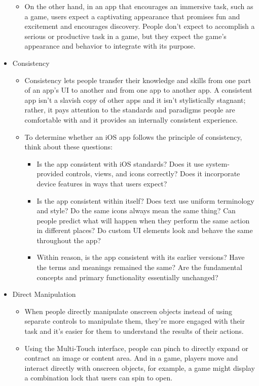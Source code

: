 \begin{itemize}
\begin{itemize}
	\newpage
	\item On the other hand, in an app that encourages an immersive task, such as a game, users expect a captivating appearance that promises fun and excitement and encourages discovery. People don't expect to accomplish a serious or productive task in a game, but they expect the game's appearance and behavior to integrate with its purpose.
	\end{itemize}
\item Consistency
	\begin{itemize}
	\item Consistency lets people transfer their knowledge and skills from one part of an app's UI to another and from one app to another app. A consistent app isn't a slavish copy of other apps and it isn't stylistically stagnant; rather, it pays attention to the standards and paradigms people are comfortable with and it provides an internally consistent experience. 
	\item To determine whether an iOS app follows the principle of consistency, think about these questions:
		\begin{itemize}
		\item Is the app consistent with iOS standards? Does it use system-provided controls, views, and icons correctly? Does it incorporate device features in ways that users expect?
		\item Is the app consistent within itself? Does text use uniform terminology and style? Do the same icons always mean the same thing? Can people predict what will happen when they perform the same action in different places? Do custom UI elements look and behave the same throughout the app?
		\item Within reason, is the app consistent with its earlier versions? Have the terms and meanings remained the same? Are the fundamental concepts and primary functionality essentially unchanged?
		\end{itemize}
	\end{itemize}
\item Direct Manipulation
	\begin{itemize}
	\item When people directly manipulate onscreen objects instead of using separate controls to manipulate them, they're more engaged with their task and it's easier for them to understand the results of their actions. 
	\item Using the Multi-Touch interface, people can pinch to directly expand or contract an image or content area. And in a game, players move and interact directly with onscreen objects, for example, a game might display a combination lock that users can spin to open. 


\end{itemize}
\end{itemize}
